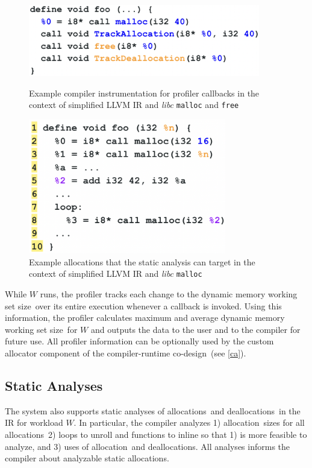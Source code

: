 \documentclass{article}
\def\crcd{compiler-runtime co-design}
\def\ALL{allocation}
\def\ALLS{allocations}
\def\DALLS{deallocations}
\def\DWS{dynamic memory working set size}
\begin{document}
\begin{figure}
    \centering
    \begin{minipage}{0.45\textwidth}
        \centering
        \includegraphics[width=0.9\textwidth]{figs/pins.png} 
        \caption{Example compiler instrumentation for profiler callbacks in the 
        context of simplified LLVM IR and \textit{libc} \texttt{malloc}
        and \texttt{free}}  
	    \label{fig:pins}
    \end{minipage}\hfill
    \begin{minipage}{0.45\textwidth}
        \centering
        \includegraphics[width=0.77\textwidth]{figs/sizes.png} 
        \caption{Example allocations that the static analysis can target in the 
        context of simplified LLVM IR and \textit{libc} \texttt{malloc}}  
	    \label{fig:sizes}
    \end{minipage}\hfill
\end{figure}

While $W$ runs, the profiler tracks each change to the \DWS\ over its entire execution 
whenever a callback is invoked. Using this information, the profiler calculates maximum 
and average \DWS\ for $W$ and outputs the data to the user and to the compiler for future 
use. All profiler information can be optionally used by the custom allocator component of
the \crcd\ (see \ref{ca}).

\subsection{Static Analyses} \label{sa}
The system also supports static analyses of \ALLS\ and \DALLS\ in the IR for workload $W$. 
In particular, the compiler analyzes 1) \ALL\ sizes for all \ALLS\, 2) loops to unroll 
and functions to inline so that 1) is more feasible to analyze, and 3) uses of \ALL\ and 
\DALLS . All analyses informs the compiler about analyzable static allocations. 
\end{document}
